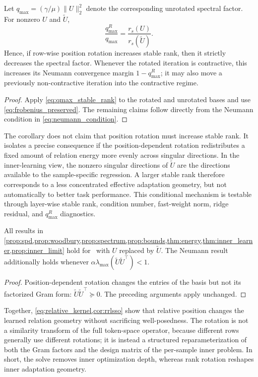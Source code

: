 \begin{corollary}
\label{cor:rotation_margin}
Let $q_{\max}=({\gamma}/{\mu})\lVert U\rVert_2^2$ denote the corresponding
unrotated spectral factor. For nonzero $U$ and $\widetilde U$,
\begin{equation}
  \frac{q_{\max}^{R}}{q_{\max}}
  =\frac{r_s(U)}{r_s(\widetilde U)}.
  \label{eq:qmax_ratio}
\end{equation}
Hence, if row-wise position rotation increases stable rank, then it strictly
decreases the spectral factor. Whenever the rotated iteration is contractive,
this increases its Neumann convergence margin $1-q_{\max}^{R}$; it may also
move a previously non-contractive iteration into the contractive regime.
\end{corollary}
\begin{proof}
Apply \cref{eq:qmax_stable_rank} to the rotated and unrotated bases and use
\cref{eq:frobenius_preserved}. The remaining claims follow directly from the
Neumann condition in \cref{eq:neumann_condition}.
\end{proof}

The corollary does not claim that position rotation must increase stable rank.
It isolates a precise consequence if the position-dependent rotation
redistributes a fixed amount of relation energy more evenly across singular
directions. In the inner-learning view, the nonzero singular directions of
$\widetilde U$ are the directions available to the sample-specific regression.
A larger stable rank therefore corresponds to a less concentrated effective
adaptation geometry, but not automatically to better task performance. This
conditional mechanism is testable through layer-wise stable rank, condition
number, fast-weight norm, ridge residual, and $q_{\max}^{R}$ diagnostics.

\begin{corollary}
\label{cor:rrlsso}
All results in
\cref{prop:spd,prop:woodbury,prop:spectrum,prop:bounds,thm:energy,thm:inner_learner,prop:inner_limit}
hold for \RRLSSO\ with $U$ replaced by $\widetilde U$. The Neumann result
additionally holds whenever
$\alpha\lambda_{\max}(\widetilde U\widetilde U^\top)<1$.
\end{corollary}
\begin{proof}
Position-dependent rotation changes the entries of the basis but not its factorized Gram form: $\widetilde U\widetilde U^\top\succeq0$. The preceding arguments apply unchanged.
\end{proof}

Together, \cref{eq:relative_kernel,cor:rrlsso} show that relative position changes the learned relation geometry without sacrificing well-posedness. The rotation is not a similarity transform of the full token-space operator, because different rows generally use different rotations; it is instead a structured reparameterization of both the Gram factors and the design matrix of the per-sample inner problem. In short, the solve removes inner optimization depth, whereas rank rotation reshapes inner adaptation geometry.
